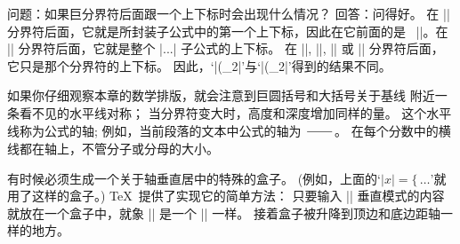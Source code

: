 \ddanger 问题：如果巨分界符后面跟一个上下标时会出现什么情况？
回答：问得好。%
在 |\left| 分界符后面，它就是所封装子公式中的第一个上下标，因此在它前面的是%
~|{}|。在 |\right| 分界符后面，它就是整个 |\left...\right| 子公式的上下标。%
在 |\bigl|, |\bigr|, |\bigm| 或 |\big| 分界符后面，它只是那个分界符的上下标。%
因此，`|\bigl(_2|'与`|\left(_2|'得到的结果不同。

\danger 如果你仔细观察本章的数学排版，就会注意到巨圆括号和大括号关于基线%
附近一条看不见的水平线对称；
当分界符变大时，高度和深度增加同样的量。%
这个水平线称为公式的{轴};
例如，当前段落的文本中公式的轴为 $\hskip 2em\over$。%
在每个分数中的横线都在轴上，不管分子或分母的大小。

\danger 有时候必须生成一个关于轴垂直居中的特殊的盒子。%
(例如，上面的`$\vert x\vert=\bigl\{\,\ldots$'就用了这样的盒子。)
 \TeX\ 提供了实现它的简单方法：
只要输入
\begindisplay
||
\enddisplay
\1垂直模式的内容就放在一个盒子中，就象 |\vcenter| 是一个 |\vbox| 一样。%
接着盒子被升降到顶边和底边距轴一样的地方。


